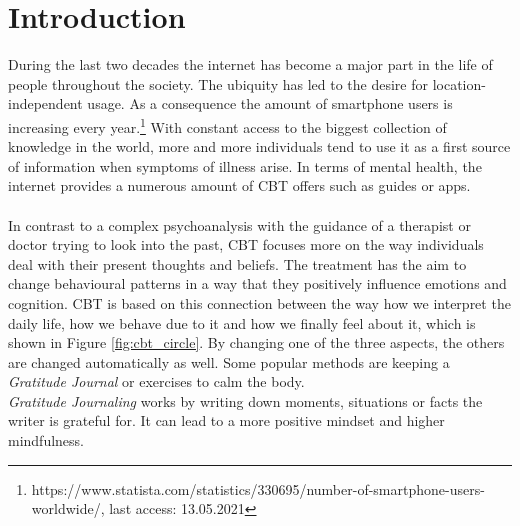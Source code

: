 \documentclass[sigconf, nonacm]{acmart}
\begin{document}
\keywords{}

\maketitle

\section{Introduction}
During the last two decades the internet has become a major part in the life
of people throughout the society. The ubiquity has led to the desire for 
location-independent usage. As a consequence the amount of
smartphone users is increasing every year.\footnote{https://www.statista.com/statistics/330695/number-of-smartphone-users-worldwide/, last access: 13.05.2021}
With constant access to the biggest collection of knowledge in the world,
more and more individuals tend to use it as a first source of information when
symptoms of illness arise\cite{Wyatt2015}. 
In terms of mental health, the internet provides a numerous amount of CBT offers such as guides
or apps. 
\\\\
In contrast to a complex psychoanalysis with the guidance of a therapist or doctor trying to look into the past,
CBT focuses more on the way individuals deal with their present thoughts and beliefs. The treatment has the aim to
change behavioural patterns in a way that they positively influence emotions and cognition. CBT is based on this connection
between the way how we interpret the daily life, how we behave due to it and how we finally feel about it, which is shown in Figure \ref{fig:cbt_circle}. By changing one of the three aspects,
the others are changed automatically as well. Some popular methods are keeping a \emph{Gratitude Journal} or exercises to calm the body.\cite{Spangler2002}
\\
\emph{Gratitude Journaling} works by writing down moments, situations or facts the writer is grateful for. It can lead to a more positive mindset and higher mindfulness.\cite{Flinchbaugh2012} 
\end{document}
